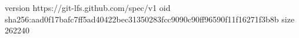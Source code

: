 version https://git-lfs.github.com/spec/v1
oid sha256:aad0f17bafc7ff5ad40422bec31350283fcc9090c90ff96590f11f16271f3b8b
size 262240
